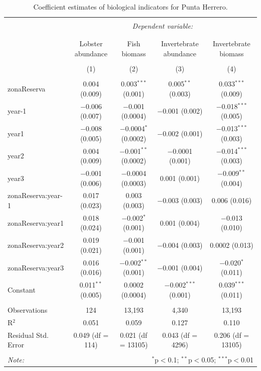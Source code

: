 \documentclass[]{article}
\begin{document}
\begin{table}[!htbp] \centering 
  \caption{Coefficient estimates of biological indicators for Punta Herrero.} 
  \label{} 
\small 
\begin{tabular}{@{\extracolsep{1pt}}lcccc} 
\\[-1.8ex]\hline 
\hline \\[-1.8ex] 
 & \multicolumn{4}{c}{\textit{Dependent variable:}} \\ 
\cline{2-5} 
\\[-1.8ex] & \multicolumn{4}{c}{} \\ 
 & Lobster abundance & Fish biomass & Invertebrate abundance & Invertebrate biomass \\ 
\\[-1.8ex] & (1) & (2) & (3) & (4)\\ 
\hline \\[-1.8ex] 
 zonaReserva & 0.004 (0.009) & 0.003$^{***}$ (0.001) & 0.005$^{**}$ (0.003) & 0.033$^{***}$ (0.009) \\ 
  year-1 & $-$0.006 (0.007) & $-$0.001 (0.0004) & $-$0.001 (0.002) & $-$0.018$^{***}$ (0.005) \\ 
  year1 & $-$0.008 (0.005) & $-$0.0004$^{*}$ (0.0002) & $-$0.002 (0.001) & $-$0.013$^{***}$ (0.003) \\ 
  year2 & 0.004 (0.009) & $-$0.001$^{**}$ (0.0002) & $-$0.0001 (0.001) & $-$0.014$^{***}$ (0.003) \\ 
  year3 & $-$0.001 (0.006) & $-$0.0004 (0.0003) & 0.001 (0.001) & $-$0.009$^{**}$ (0.004) \\ 
  zonaReserva:year-1 & 0.017 (0.023) & 0.003 (0.003) & $-$0.003 (0.003) & 0.006 (0.016) \\ 
  zonaReserva:year1 & 0.018 (0.024) & $-$0.002$^{*}$ (0.001) & 0.001 (0.004) & $-$0.013 (0.010) \\ 
  zonaReserva:year2 & 0.019 (0.021) & $-$0.001 (0.001) & $-$0.004 (0.003) & 0.0002 (0.013) \\ 
  zonaReserva:year3 & 0.016 (0.016) & $-$0.002$^{**}$ (0.001) & $-$0.001 (0.004) & $-$0.020$^{*}$ (0.011) \\ 
  Constant & 0.011$^{**}$ (0.005) & 0.0002 (0.0004) & $-$0.002$^{***}$ (0.001) & 0.039$^{***}$ (0.011) \\ 
 \hline \\[-1.8ex] 
Observations & 124 & 13,193 & 4,340 & 13,193 \\ 
R$^{2}$ & 0.051 & 0.059 & 0.127 & 0.110 \\ 
Residual Std. Error & 0.049 (df = 114) & 0.021 (df = 13105) & 0.043 (df = 4296) & 0.206 (df = 13105) \\ 
\hline 
\hline \\[-1.8ex] 
\textit{Note:}  & \multicolumn{4}{r}{$^{*}$p$<$0.1; $^{**}$p$<$0.05; $^{***}$p$<$0.01} \\ 
\end{tabular} 
\end{table}
\end{document}
